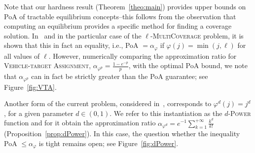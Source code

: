 Note that our hardness result (Theorem~\ref{theo:main}) provides upper bounds on PoA of tractable equilibrium concepts--this follows from the observation that computing an equilibrium provides a specific method for finding a coverage solution. In~\cite{CPM19} and in the particular case of the $\ell$-\textsc{MultiCoverage} problem, it is shown that this in fact an equality, i.e., PoA $=\alpha_{\varphi}$ if $\varphi(j) = \min(j,\ell)$ for all values of $\ell$. However, numerically comparing the approximation ratio for \textsc{Vehicle-target Assignment}, $\alpha_{\varphi^p} = \frac{1 - e^{-p}}{p}$, with the optimal PoA bound, we note that $\alpha_{\varphi^p}$ can in fact be strictly greater than the PoA guarantee; see Figure~\ref{fig:VTA}.

Another form of the current problem, considered in~\cite{PM19}, corresponds to $\varphi^d(j) = j^d$, for a given parameter $d \in (0,1)$. We refer to this instantiation as the $d$-\textsc{Power} function and for it obtain the approximation ratio $\alpha_{\varphi^d} = e^{-1}\sum_{k=1}^{+\infty}\frac{k^d}{k!}$ (Proposition~\ref{prop:dPower}). In this case, the question whether the inequality PoA $\leq \alpha_{\varphi}$ is tight remains open; see Figure~\ref{fig:dPower}.

